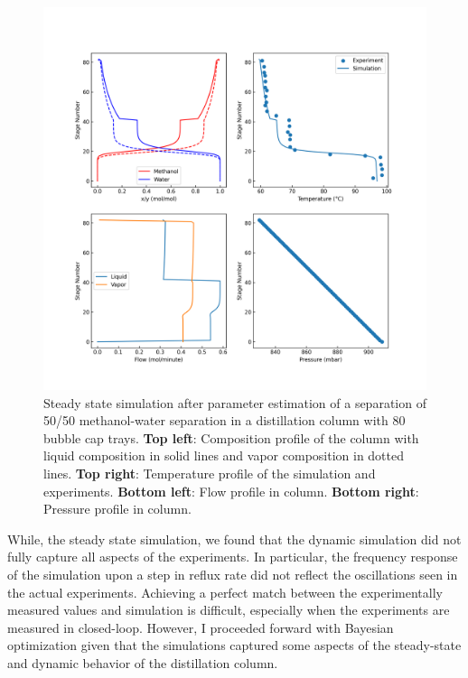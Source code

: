 \begin{figure}
    \centering
    \includegraphics[width=\textwidth]{gfx/Chapter06/2021_11_17_steady_state_estimated.png}
    \caption{Steady state simulation after parameter estimation of a separation of 50/50 methanol-water separation in a distillation column with 80 bubble cap trays. \textbf{Top left}: Composition profile of the column with liquid composition in solid lines and vapor composition in dotted lines. \textbf{Top right}: Temperature profile of the simulation and experiments. \textbf{Bottom left}: Flow profile in column. \textbf{Bottom right}: Pressure profile in column.}
    \label{fig:estimated}
\end{figure}

While, the steady state simulation, we found that the dynamic simulation did not fully capture all aspects of the experiments. In particular, the frequency response of the simulation upon a step in reflux rate did not reflect the oscillations seen in the actual experiments. Achieving a perfect match between the experimentally measured values and simulation is difficult, especially when the experiments are measured in closed-loop. However, I proceeded forward with Bayesian optimization given that the simulations captured some aspects of the steady-state and dynamic behavior of the distillation column.
 
